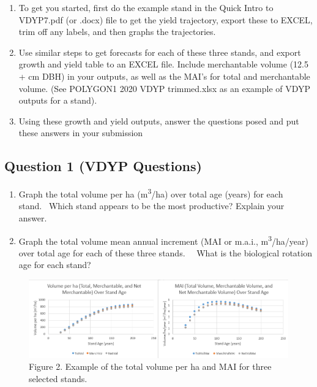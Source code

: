 \documentclass[
  letterpaper,
]{book}
\providecommand{\tightlist}{%
  \setlength{\itemsep}{0pt}\setlength{\parskip}{0pt}}\usepackage{longtable,booktabs,array}
\begin{document}
\begin{enumerate}
\def\labelenumi{\arabic{enumi}.}
\item
  To get you started, first do the example stand in the Quick Intro to
  VDYP7.pdf (or .docx) file to get the yield trajectory, export these to
  EXCEL, trim off any labels, and then graphs the trajectories.
\item
  Use similar steps to get forecasts for each of these three stands, and
  export growth and yield table to an EXCEL file. Include merchantable
  volume (12.5 + cm DBH) in your outputs, as well as the MAI's for total
  and merchantable volume. (See POLYGON1 2020 VDYP trimmed.xlsx as an
  example of VDYP outputs for a stand).
\item
  Using these growth and yield outputs, answer the questions posed and
  put these answers in your submission
\end{enumerate}

\hypertarget{question-1-vdyp-questions}{%
\subsection{Question 1 (VDYP
Questions)}\label{question-1-vdyp-questions}}

\begin{enumerate}
\def\labelenumi{\arabic{enumi}.}
\tightlist
\item
  Graph the total volume per ha (m\textsuperscript{3}/ha) over total age
  (years) for each stand.~ Which stand appears to be the most
  productive? Explain your answer.~
\item
  Graph the total volume mean annual increment (MAI or m.a.i.,
  m\textsuperscript{3}/ha/year) over total age for each of these three
  stands.~~ What is the biological rotation age for each stand?
\end{enumerate}

\begin{figure}

{\centering \includegraphics{images/clipboard-1872295870.png}

}

\caption{Figure 2. Example of the total volume per ha and MAI for three
selected stands.}

\end{figure}
\end{document}
